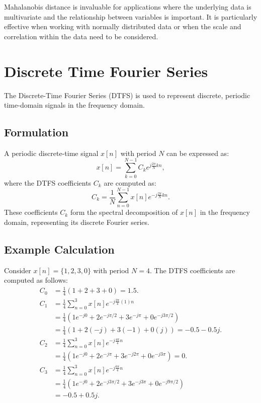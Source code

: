 \documentclass[12pt]{article}
\begin{document}
Mahalanobis distance is invaluable for applications where the underlying data is multivariate and the relationship between variables is important. It is particularly effective when working with normally distributed data or when the scale and correlation within the data need to be considered.
\section{Discrete Time Fourier Series}
The Discrete-Time Fourier Series (DTFS) is used to represent discrete, periodic time-domain signals in the frequency domain.

\subsection{Formulation}
A periodic discrete-time signal $x[n]$ with period $N$ can be expressed as:
\begin{equation}
    x[n] = \sum_{k=0}^{N-1} C_k e^{j \frac{2\pi}{N} k n},
\end{equation}
where the DTFS coefficients $C_k$ are computed as:
\begin{equation}
    C_k = \frac{1}{N} \sum_{n=0}^{N-1} x[n] e^{-j \frac{2\pi}{N} k n}.
\end{equation}
These coefficients $C_k$ form the spectral decomposition of $x[n]$ in the frequency domain, representing its discrete Fourier series.

\subsection{Example Calculation}
Consider $x[n] = \{1,2,3,0\}$ with period $N=4$. The DTFS coefficients are computed as follows:
\begin{align*}
    C_0 &= \frac{1}{4} (1 + 2 + 3 + 0) = 1.5. \\
    C_1 &= \frac{1}{4} \sum_{n=0}^{3} x[n] e^{-j \frac{2\pi}{4} (1) n} \\
        &= \frac{1}{4} \left( 1 e^{-j 0} + 2 e^{-j \pi/2} + 3 e^{-j \pi} + 0 e^{-j 3\pi/2} \right) \\
        &= \frac{1}{4} \left( 1 + 2(-j) + 3(-1) + 0(j) \right) = -0.5 - 0.5j. \\
    C_2 &= \frac{1}{4} \sum_{n=0}^{3} x[n] e^{-j \frac{4\pi}{4} n} \\
        &= \frac{1}{4} (1 e^{-j0} + 2 e^{-j\pi} + 3 e^{-j2\pi} + 0 e^{-j3\pi}) = 0. \\
    C_3 &= \frac{1}{4} \sum_{n=0}^{3} x[n] e^{-j \frac{6\pi}{4} n} \\
        &= \frac{1}{4} (1 e^{-j0} + 2 e^{-j3\pi/2} + 3 e^{-j3\pi} + 0 e^{-j9\pi/2}) \\
        &= -0.5 + 0.5j.
\end{align*}
\end{document}
